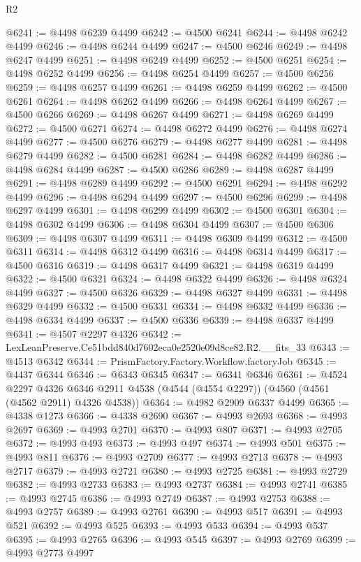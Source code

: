 \begin{lexlean}{R2}
\begin{coremodule}
@6241 := @4498 @6239 @4499
@6242 := @4500 @6241
@6244 := @4498 @6242 @4499
@6246 := @4498 @6244 @4499
@6247 := @4500 @6246
@6249 := @4498 @6247 @4499
@6251 := @4498 @6249 @4499
@6252 := @4500 @6251
@6254 := @4498 @6252 @4499
@6256 := @4498 @6254 @4499
@6257 := @4500 @6256
@6259 := @4498 @6257 @4499
@6261 := @4498 @6259 @4499
@6262 := @4500 @6261
@6264 := @4498 @6262 @4499
@6266 := @4498 @6264 @4499
@6267 := @4500 @6266
@6269 := @4498 @6267 @4499
@6271 := @4498 @6269 @4499
@6272 := @4500 @6271
@6274 := @4498 @6272 @4499
@6276 := @4498 @6274 @4499
@6277 := @4500 @6276
@6279 := @4498 @6277 @4499
@6281 := @4498 @6279 @4499
@6282 := @4500 @6281
@6284 := @4498 @6282 @4499
@6286 := @4498 @6284 @4499
@6287 := @4500 @6286
@6289 := @4498 @6287 @4499
@6291 := @4498 @6289 @4499
@6292 := @4500 @6291
@6294 := @4498 @6292 @4499
@6296 := @4498 @6294 @4499
@6297 := @4500 @6296
@6299 := @4498 @6297 @4499
@6301 := @4498 @6299 @4499
@6302 := @4500 @6301
@6304 := @4498 @6302 @4499
@6306 := @4498 @6304 @4499
@6307 := @4500 @6306
@6309 := @4498 @6307 @4499
@6311 := @4498 @6309 @4499
@6312 := @4500 @6311
@6314 := @4498 @6312 @4499
@6316 := @4498 @6314 @4499
@6317 := @4500 @6316
@6319 := @4498 @6317 @4499
@6321 := @4498 @6319 @4499
@6322 := @4500 @6321
@6324 := @4498 @6322 @4499
@6326 := @4498 @6324 @4499
@6327 := @4500 @6326
@6329 := @4498 @6327 @4499
@6331 := @4498 @6329 @4499
@6332 := @4500 @6331
@6334 := @4498 @6332 @4499
@6336 := @4498 @6334 @4499
@6337 := @4500 @6336
@6339 := @4498 @6337 @4499
@6341 := @4507 @2297 @4326
@6342 := LexLeanPreserve.Ce51bdd840d7602eca0e2520e09d8ce82.R2.__fits_33
@6343 := @4513 @6342
@6344 := PrismFactory.Factory.Workflow.factoryJob
@6345 := @4437 @6344
@6346 := @6343 @6345
@6347 := @6341 @6346
@6361 := @4524
    @2297
    @4326
    @6346
    @2911
    @4538
    (@4544 (@4554 @2297))
    (@4560 (@4561 (@4562 @2911) @4326 @4538))
@6364 := @4982 @2909 @6337 @4499
@6365 := @4338 @1273
@6366 := @4338 @2690
@6367 := @4993 @2693
@6368 := @4993 @2697
@6369 := @4993 @2701
@6370 := @4993 @807
@6371 := @4993 @2705
@6372 := @4993 @493
@6373 := @4993 @497
@6374 := @4993 @501
@6375 := @4993 @811
@6376 := @4993 @2709
@6377 := @4993 @2713
@6378 := @4993 @2717
@6379 := @4993 @2721
@6380 := @4993 @2725
@6381 := @4993 @2729
@6382 := @4993 @2733
@6383 := @4993 @2737
@6384 := @4993 @2741
@6385 := @4993 @2745
@6386 := @4993 @2749
@6387 := @4993 @2753
@6388 := @4993 @2757
@6389 := @4993 @2761
@6390 := @4993 @517
@6391 := @4993 @521
@6392 := @4993 @525
@6393 := @4993 @533
@6394 := @4993 @537
@6395 := @4993 @2765
@6396 := @4993 @545
@6397 := @4993 @2769
@6399 := @4993 @2773 @4997

\end{coremodule}
\end{lexlean}

